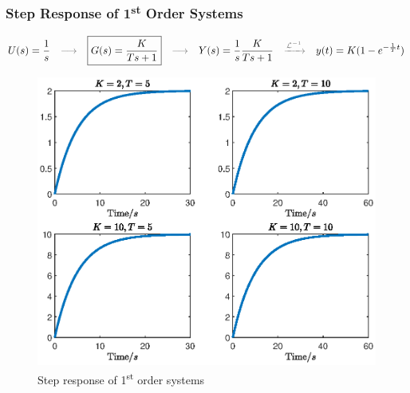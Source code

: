 \subsubsection{Step Response of 1\textsuperscript{st} Order Systems}
\[
U(s)=\frac{1}{s} 
\quad {\color{gray}\longrightarrow} \quad 
\boxed{G(s)=\frac{K}{Ts+1}} 
\quad {\color{gray}\longrightarrow} \quad  
Y(s)= \frac{1}{s}\frac{K}{Ts+1} 
\quad {\color{gray}\xrightarrow[]{\mathcal{L}^{-1}}} \quad  
y(t) = K(1-e^{-\frac{1}{T}t})
\]

\begin{figure}[H] 
    \centering 
    \includegraphics[width=.8\textwidth]{images/step_response.eps}
    \caption{Step response of 1\textsuperscript{st} order systems}
\end{figure}

